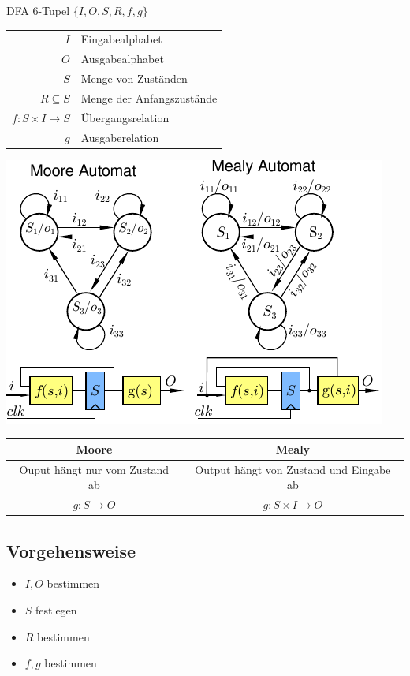 \documentclass[6pt,a4paper]{scrartcl}
\newcommand{\eset}[1]{\ensuremath{\bigl\{#1\bigr\}}}								%
\newcommand{\ra}[0]{\ensuremath{\rightarrow}} 									%
\begin{document}
\begin{multicols}{3}
DFA 6-Tupel $\eset{I, O, S, R, f, g}$ \\

\begin{tabular}{r | l} 
$I$ & Eingabealphabet \\
$O$ &  Ausgabealphabet \\
$S$ & Menge von Zuständen \\
$R \subseteq S$ &  Menge der Anfangszustände \\
$f: S \times I \ra S$  &  Übergangsrelation \\
$g$ & Ausgaberelation \\
\end{tabular}

\includegraphics{./img/ds/automaten.pdf}\\


\begin{tabular}{c | c}
 Moore & Mealy \\ \midrule
 Ouput hängt nur vom Zustand ab & Output hängt von Zustand und Eingabe ab\\
 $g: S \ra O$ & $g: S \times I \ra O$
\end{tabular}

\subsection{Vorgehensweise} %
\begin{itemize}
	\item $I, O$ bestimmen
	\item $S$ festlegen 
	\item $R$ bestimmen
	\item $f,g$ bestimmen
\end{itemize}

\end{multicols}
\end{document}
